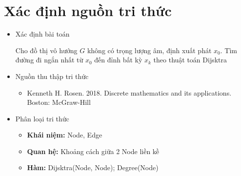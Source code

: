 \section{Xác định nguồn tri thức} 

\begin{itemize}
	\item Xác định bài toán
	
	Cho đồ thị vô hướng $G$ không có trọng lượng âm, định xuất phát $x_0$. Tìm đường đi ngắn nhất từ $x_0$ đến đỉnh bất kỳ $x_k$ theo thuật toán Dijsktra
	
	\item Nguồn thu thập tri thức
	\begin{itemize}
		\item Kenneth H. Rosen. 2018. Discrete mathematics and its applications. Boston: McGraw-Hill
	\end{itemize}
	
	\item Phân loại tri thức
	\begin{itemize}
		\item \textbf{Khái niệm: } Node, Edge
		\item \textbf{Quan hệ: } Khoảng cách giữa 2 Node liền kề
		\item \textbf{Hàm: } Dijsktra(Node, Node); Degree(Node)
	\end{itemize}
\end{itemize}





